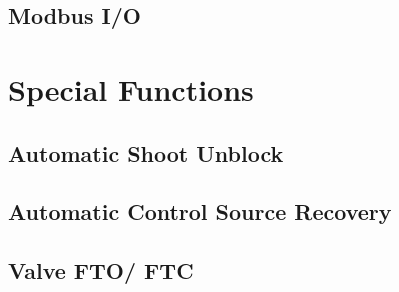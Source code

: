    
    
    \subsection{Modbus I/O}

\section{Special Functions}

    \subsection{Automatic Shoot Unblock}

    \subsection{Automatic Control Source Recovery}

    \subsection{Valve FTO/ FTC} \label{sec:valveFtoFtc}

    